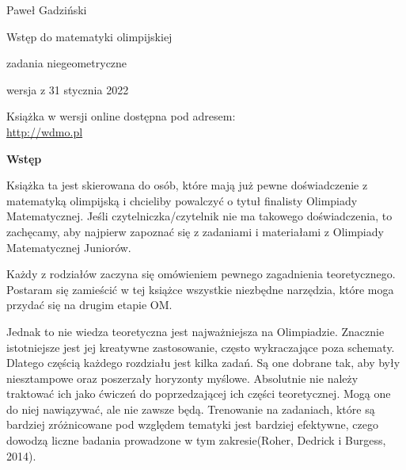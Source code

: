 \thispagestyle{empty}\addtocounter{page}{-1}
	\begin{center}
		\fontsize{15}{15}\selectfont
		Paweł Gadziński

		\vspace{50px}

		\fontsize{40}{40}\selectfont
		\textcolor{kolor}{Wstęp do matematyki olimpijskiej}

		\vspace{20px}

		\fontsize{25}{25}\selectfont
		\textcolor{kolor}{zadania niegeometryczne}

		\vspace{40px}

		\fontsize{15}{15}\selectfont
		wersja z 31 stycznia 2022
	\end{center}
\vspace*{\fill}
\begin{center}
		\fontsize{15}{15}\selectfont
		Książka w wersji online dostępna pod adresem: \\
		\url{http://wdmo.pl}
\end{center}
\newpage
	\vspace*{\fill}
	\begin{center}
		\fontsize{20}{20}\selectfont
		\textbf{Wstęp}
		\vspace{30px}
	\end{center}
		\noindent
		Książka ta jest skierowana do osób, które mają już pewne doświadczenie z matematyką olimpijską i chcieliby powalczyć o tytuł finalisty Olimpiady Matematycznej. Jeśli czytelniczka/czytelnik nie ma takowego doświadczenia, to zachęcamy, aby najpierw zapoznać się z zadaniami i materiałami z Olimpiady Matematycznej Juniorów.

		\vspace{10px}
		\noindent
		Każdy z rodziałów zaczyna się omówieniem pewnego zagadnienia teoretycznego. Postaram się zamieścić w tej książce wszystkie niezbędne narzędzia, które moga przydać się na drugim etapie OM. 

		\vspace{10px}
		\noindent
		Jednak to nie wiedza teoretyczna jest najważniejsza na Olimpiadzie. Znacznie istotniejsze jest jej kreatywne zastosowanie, często wykraczające poza schematy. Dlatego częścią każdego rozdziału jest kilka zadań. Są one dobrane tak, aby były niesztampowe oraz poszerzały horyzonty myślowe. Absolutnie nie należy traktować ich jako ćwiczeń do poprzedzającej ich części teoretycznej. Mogą one do niej nawiązywać, ale nie zawsze będą. Trenowanie na zadaniach, które są bardziej zróżnicowane pod względem tematyki jest bardziej efektywne, czego dowodzą liczne badania prowadzone w tym zakresie(Roher, Dedrick i Burgess, 2014). 

